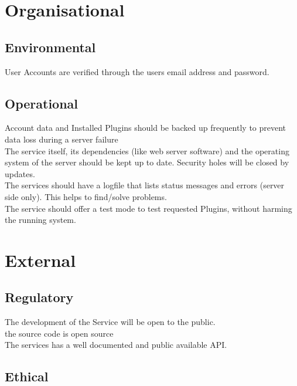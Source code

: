 \documentclass[8pt]{beamer}
\begin{document}
\section{Organisational}
\subsection{Environmental}
\begin{frame}
User Accounts are verified through the users email address and
password.
\end{frame}

\subsection{Operational}

\begin{frame}
Account data and Installed Plugins should be backed up frequently
to prevent data loss during a server failure
\\\pause The service itself, its dependencies (like web server software) and
the operating system of the server should be kept up to date. Security holes
will be closed by updates.
\\\pause The services should have a logfile that lists status messages and
errors (server side only). This helps to find/solve problems.
\\\pause  The service should offer a test mode to test requested Plugins,
without harming the running system.
\end{frame}

\section{External}

\subsection{Regulatory}

\begin{frame}
The development of the Service will be open to the public.\\\pause
the source code is open source\\\pause
The services has a well documented and public available API.
\end{frame}

\subsection{Ethical}
\end{document}
